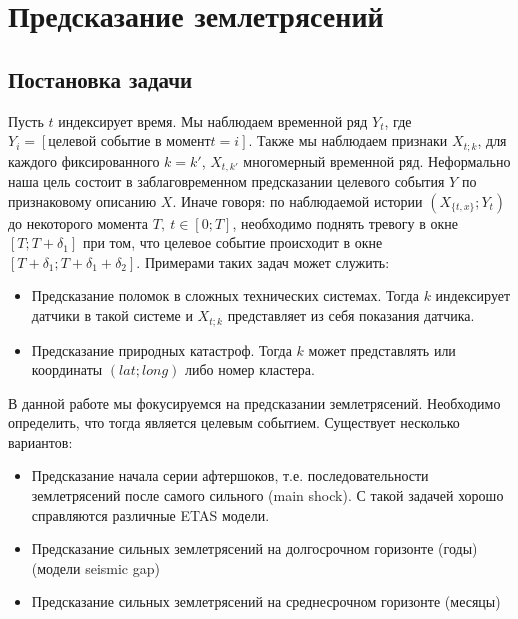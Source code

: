 \section{Предсказание землетрясений}

\subsection{Постановка задачи}
Пусть $t$ индексирует время. Мы наблюдаем временной ряд $Y_t$, где $Y_i = [\text{целевой событие в момент} t=i]$. Также мы наблюдаем признаки $X_ {t;k}$, для каждого фиксированного $k=k'$, $X_{t, k'}$ многомерный временной ряд. Неформально наша цель состоит в заблаговременном предсказании целевого события $Y$ по признаковому описанию $X$. Иначе говоря: по наблюдаемой истории $(X_{\{t, x\}}; Y_t)$ до некоторого момента $T ,~t\in [0;T]$, необходимо поднять тревогу в окне $[T; T+\delta_1]$ при том, что целевое событие происходит в окне  $[T+\delta_1; T+\delta_1+\delta_2]$. Примерами таких задач может служить:

\begin{itemize}
\item Предсказание поломок в сложных технических системах. Тогда $k$ индексирует датчики в такой системе и $X_{t;k}$ представляет из себя показания датчика.
\item Предсказание природных катастроф. Тогда $k$ может представлять или координаты $(lat;long)$ либо номер кластера.
\end{itemize}

В данной работе мы фокусируемся на предсказании землетрясений. Необходимо определить, что тогда является целевым событием. Существует несколько вариантов:

\begin{itemize}
\item Предсказание начала серии афтершоков, т.е. последовательности землетрясений после самого сильного (main shock). С такой задачей хорошо справляются различные ETAS модели.
\item Предсказание сильных землетрясений на долгосрочном горизонте (годы) (модели seismic gap)
\item Предсказание сильных землетрясений на среднесрочном горизонте (месяцы)
\end{itemize}

